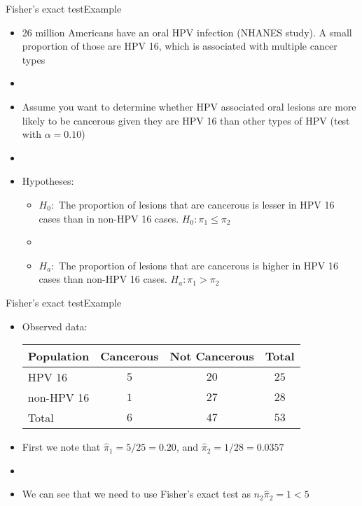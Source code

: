 \documentclass[xcolor=dvipsnames]{beamer}
\begin{document}
\begin{frame}{Fisher's exact test}{Example}
	\begin{itemize}
		\item 26 million Americans have an oral HPV infection (NHANES study). A small proportion of those are HPV 16, which is associated with multiple cancer types
		\item[]
		\item Assume you want to determine whether HPV associated oral lesions are more likely to be cancerous given they are HPV 16 than other types of HPV (test with $\alpha = 0.10$)
		\item[]
		\item Hypotheses:
		\begin{itemize}
			\item $H_0:$ The proportion of lesions that are cancerous is lesser in HPV 16 cases than in non-HPV 16 cases. $H_0: \pi_1 \leq \pi_2$
			\item[]
			\item $H_a:$ The proportion of lesions that are cancerous is higher in HPV 16 cases than non-HPV 16 cases. $H_a: \pi_1 > \pi_2$
		\end{itemize}
	\end{itemize}
\end{frame}

\begin{frame}{Fisher's exact test}{Example}
	\begin{itemize}
		\item Observed data:
		\begin{center}
			\begin{tabular}{l|cc|c}
				\hline
				\textbf{Population} & \textbf{Cancerous} & \textbf{Not Cancerous} & \textbf{Total} \\ \hline \hline
				HPV 16 & $5$ &$20$ & $25$\\
				non-HPV 16 & $1$ &$27$ & $28$ \\
				Total & $6$ & $47$ & $53$ \\ \hline
			\end{tabular}
		\end{center}
	\vspace{5mm}
	\item First we note that $\hat{\pi}_1 = 5/25 = 0.20$, and $\hat{\pi}_2 = 1/28 = 0.0357$ 
	\item[]
	\item We can see that we need to use Fisher's exact test as $n_2 \hat{\pi}_2 =1 <5$
	\end{itemize}
\end{frame}
\end{document}

